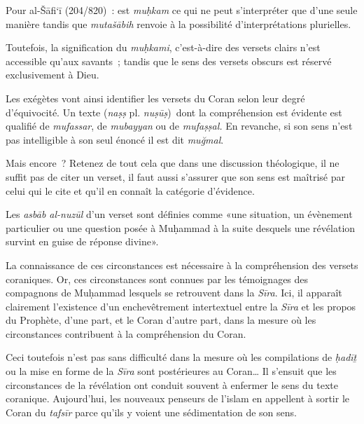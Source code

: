 Pour al-Šāfi`ī (204/820)~: est \emph{muḥkam} ce qui ne peut
s'interpréter que d'une seule manière tandis que \emph{mutašābih}
renvoie à la possibilité d'interprétations plurielles.

Toutefois, la signification du \emph{muḥkami}, c'est-à-dire des versets
clairs n'est accessible qu'aux savants~; tandis que le sens des versets
obscurs est réservé exclusivement à Dieu.

Les exégètes vont ainsi identifier les versets du Coran selon leur degré
d'équivocité. Un texte (\emph{naṣṣ} pl. \emph{nuṣūṣ})~dont la
compréhension est évidente est qualifié de \emph{mufassar}, de
\emph{mubayyan} ou de \emph{mufaṣṣal.} En revanche, si son sens n'est
pas intelligible à son seul énoncé il est dit \emph{muğmal}.

Mais encore~? Retenez de tout cela que dans une discussion théologique,
il ne suffit pas de citer un verset, il faut aussi s'assurer que son
sens est maîtrisé par celui qui le cite et qu'il en connaît la catégorie
d'évidence.

\begin{Def}
Les \emph{asbāb al-nuzūl} d'un verset sont définies comme «une
situation, un évènement particulier ou une question posée à Muḥammad à
la suite desquels une révélation survint en guise de réponse divine».
\end{Def}


La connaissance de ces circonstances est nécessaire à la compréhension
des versets coraniques. Or, ces circonstances sont connues par les
témoignages des compagnons de Muḥammad lesquels se retrouvent dans la
\emph{Sīra}. Ici, il apparaît clairement l'existence d'un enchevêtrement
intertextuel entre la \emph{Sīra} et les propos du Prophète, d'une part,
et le Coran d'autre part, dans la mesure où les circonstances
contribuent à la compréhension du Coran.

Ceci toutefois n'est pas sans difficulté dans la mesure où les
compilations de \emph{ḥadīṯ} ou la mise en forme de la \emph{Sīra} sont
postérieures au Coran\ldots{} Il s'ensuit que les circonstances de la
révélation ont conduit souvent à enfermer le sens du texte coranique.
Aujourd'hui, les nouveaux penseurs de l'islam en appellent à sortir le
Coran du \emph{tafsīr} parce qu'ils y voient une sédimentation de son
sens.

